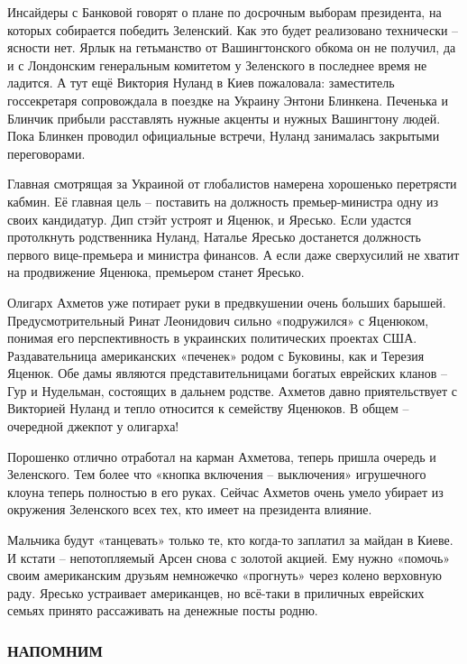 Инсайдеры с Банковой говорят о плане по досрочным выборам президента, на
которых собирается победить Зеленский. Как это будет реализовано технически –
ясности нет. Ярлык на гетьманство от Вашингтонского обкома он не получил, да и
с Лондонским генеральным комитетом у Зеленского в последнее время не ладится. А
тут ещё Виктория Нуланд в Киев пожаловала: заместитель госсекретаря
сопровождала в поездке на Украину Энтони Блинкена. Печенька и Блинчик прибыли
расставлять нужные акценты и нужных Вашингтону людей. Пока Блинкен проводил
официальные встречи, Нуланд занималась закрытыми переговорами. 

Главная смотрящая за Украиной от глобалистов намерена хорошенько перетрясти
кабмин. Её главная цель – поставить на должность премьер-министра одну из своих
кандидатур. Дип стэйт устроят и Яценюк, и Яресько. Если удастся протолкнуть
родственника Нуланд, Наталье Яресько достанется должность первого вице-премьера
и министра финансов. А если даже сверхусилий не хватит на продвижение Яценюка,
премьером станет Яресько. 

Олигарх Ахметов уже потирает руки в предвкушении очень больших барышей.
Предусмотрительный Ринат Леонидович сильно «подружился» с Яценюком, понимая его
перспективность в украинских политических проектах США. Раздавательница
американских «печенек» родом с Буковины, как и Терезия Яценюк. Обе дамы
являются представительницами богатых еврейских кланов – Гур и Нудельман,
состоящих в дальнем родстве. Ахметов давно приятельствует с Викторией Нуланд и
тепло относится к семейству Яценюков. В общем – очередной джекпот у олигарха! 

Порошенко отлично отработал на карман Ахметова, теперь пришла очередь и
Зеленского. Тем более что «кнопка включения – выключения» игрушечного клоуна
теперь полностью в его руках. Сейчас Ахметов очень умело убирает из окружения
Зеленского всех тех, кто имеет на президента влияние.

Мальчика будут «танцевать» только те, кто когда-то заплатил за майдан в Киеве.
И кстати – непотопляемый Арсен снова с золотой акцией. Ему нужно «помочь»
своим американским друзьям немножечко «прогнуть» через колено верховную раду.
Яресько устраивает американцев, но всё-таки в приличных еврейских семьях
принято рассаживать на денежные посты родню.

\subsubsection{НАПОМНИМ}

